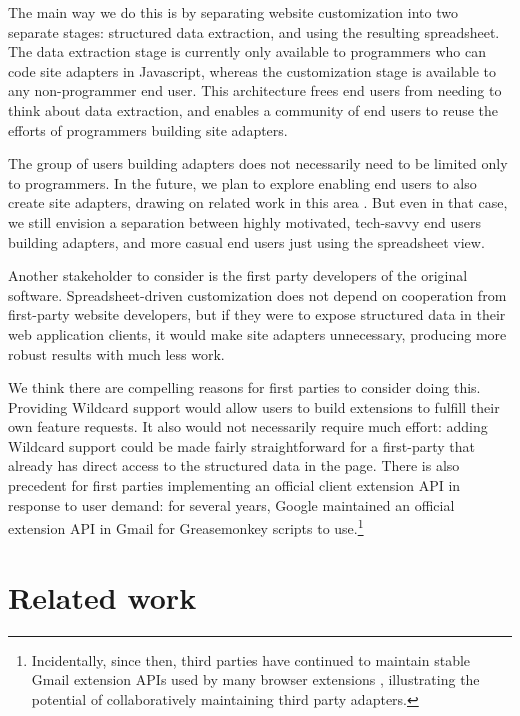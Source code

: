 \documentclass[english,submission]{programming}
\begin{document}
The main way we do this is by separating website customization into two
separate stages: structured data extraction, and using the resulting
spreadsheet. The data extraction stage is currently only available to
programmers who can code site adapters in Javascript, whereas the
customization stage is available to any non-programmer end user. This
architecture frees end users from needing to think about data
extraction, and enables a community of end users to reuse the efforts of
programmers building site adapters.

The group of users building adapters does not necessarily need to be
limited only to programmers. In the future, we plan to explore enabling
end users to also create site adapters, drawing on related work in this
area \autocite{chasins2018,huynh2006}. But even in that case, we still
envision a separation between highly motivated, tech-savvy end users
building adapters, and more casual end users just using the spreadsheet
view.

Another stakeholder to consider is the first party developers of the
original software. Spreadsheet-driven customization does not depend on
cooperation from first-party website developers, but if they were to
expose structured data in their web application clients, it would make
site adapters unnecessary, producing more robust results with much less
work.

We think there are compelling reasons for first parties to consider
doing this. Providing Wildcard support would allow users to build
extensions to fulfill their own feature requests. It also would not
necessarily require much effort: adding Wildcard support could be made
fairly straightforward for a first-party that already has direct access
to the structured data in the page. There is also precedent for first
parties implementing an official client extension API in response to
user demand: for several years, Google maintained an official extension
API in Gmail for Greasemonkey scripts to use.\footnote{Incidentally,
  since then, third parties have continued to maintain stable Gmail
  extension APIs used by many browser extensions
  \autocite{streak,talwar2019}, illustrating the potential of
  collaboratively maintaining third party adapters.}

\hypertarget{related-work}{%
\section{Related work}\label{related-work}}
\end{document}
